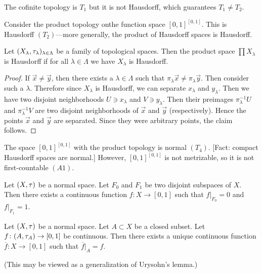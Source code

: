 \begin{example}
The cofinite topology is $T_{1}$ but it is not Hausdorff, which
guarantees $T_{1}\neq T_{2}$.
\end{example}

\begin{example}
Consider the product topology onthe function space
$[0,1]^{[0,1]}$. This is Hausdorff $(T_{2})$---more generally, the
product of Hausdorff spaces is Hausdorff.
\end{example}

\begin{proposition}
Let $(X_{\lambda},\tau_{\lambda})_{\lambda\in\Lambda}$ be a
family of topological spaces. Then the product space $\prod X_{\lambda}$
is Hausdorff if for all $\lambda\in\Lambda$ we have $X_{\lambda}$ is Hausdorff.
\end{proposition}

\begin{proof}
If $\vec{x}\neq\vec{y}$, then there exists a $\lambda\in\Lambda$ such
that $\pi_{\lambda}\vec{x}\neq\pi_{\lambda}\vec{y}$. Then consider
such a $\lambda$. Therefore since $X_{\lambda}$ is Hausdorff, we can
separate $x_{\lambda}$ and $y_{\lambda}$. Then we have two disjoint
neighborhoods $U\ni x_{\lambda}$ and $V\ni y_{\lambda}$. Then their preimages
$\pi^{-1}_{\lambda}U$ and $\pi^{-1}_{\lambda}V$ are two disjoint
neighborhoods of $\vec{x}$ and $\vec{y}$ (respectively). Hence the
points $\vec{x}$ and $\vec{y}$ are separated. Since they were
arbitrary points, the claim follows.
\end{proof}

\begin{example}
The space $[0,1]^{[0,1]}$ with the product topology is normal $(T_{4})$.
[Fact: compact Hausdorff spaces are normal.] However, $[0,1]^{[0,1]}$
is not metrizable, so it is not first-countable $(A1)$.
\end{example}

\begin{lemma}[Urysohn]
Let $(X,\tau)$ be a normal space. Let $F_{0}$ and $F_{1}$ be two
disjoint subspaces of $X$. Then there exists a continuous function
$f\colon X\to[0,1]$ such that $f|_{F_{0}}=0$ and $f|_{F_{1}}=1$.
\end{lemma}

\begin{theorem}[Tietze]
Let $(X,\tau)$ be a normal space. Let $A\subset X$ be a closed
subset. Let $f\colon(A,\tau_{A})\to[0,1]$ be continuous. Then
there exists a unique continuous function $\overline{f}\colon X\to[0,1]$
such that $\overline{f}|_{A}=f$.
\end{theorem}

(This may be viewed as a generalization of Urysohn's lemma.)

\endinput
